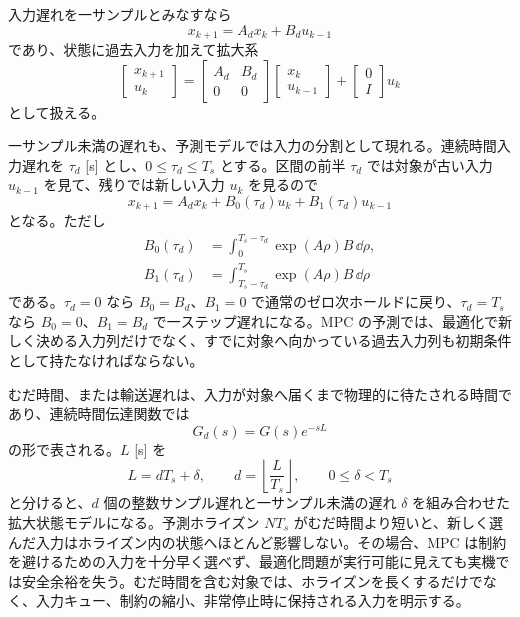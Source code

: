 入力遅れを一サンプルとみなすなら
\begin{equation}
  x_{k+1}=A_dx_k+B_du_{k-1}
\end{equation}
であり、状態に過去入力を加えて拡大系
\begin{equation}
  \begin{bmatrix}x_{k+1}\\ u_k\end{bmatrix}
  =
  \begin{bmatrix}A_d&B_d\\0&0\end{bmatrix}
  \begin{bmatrix}x_k\\ u_{k-1}\end{bmatrix}
  +
  \begin{bmatrix}0\\ I\end{bmatrix}u_k
\end{equation}
として扱える。

一サンプル未満の遅れも、予測モデルでは入力の分割として現れる。連続時間入力遅れを $\tau_d$ [s] とし、$0\le\tau_d\le T_s$ とする。区間の前半 $\tau_d$ では対象が古い入力 $u_{k-1}$ を見て、残りでは新しい入力 $u_k$ を見るので
\begin{equation}
  x_{k+1}=A_dx_k+B_0(\tau_d)u_k+B_1(\tau_d)u_{k-1}
\end{equation}
となる。ただし
\begin{align}
  B_0(\tau_d)&=\int_0^{T_s-\tau_d}\exp(A\rho)B\,\dd\rho,\\
  B_1(\tau_d)&=\int_{T_s-\tau_d}^{T_s}\exp(A\rho)B\,\dd\rho
\end{align}
である。$\tau_d=0$ なら $B_0=B_d$、$B_1=0$ で通常のゼロ次ホールドに戻り、$\tau_d=T_s$ なら $B_0=0$、$B_1=B_d$ で一ステップ遅れになる。MPC の予測では、最適化で新しく決める入力列だけでなく、すでに対象へ向かっている過去入力列も初期条件として持たなければならない。

むだ時間、または輸送遅れは、入力が対象へ届くまで物理的に待たされる時間であり、連続時間伝達関数では
\begin{equation}
  G_d(s)=G(s)e^{-sL}
\end{equation}
の形で表される。$L$ [s] を
\begin{equation}
  L=dT_s+\delta,
  \qquad
  d=\left\lfloor\frac{L}{T_s}\right\rfloor,
  \qquad
  0\le\delta<T_s
\end{equation}
と分けると、$d$ 個の整数サンプル遅れと一サンプル未満の遅れ $\delta$ を組み合わせた拡大状態モデルになる。予測ホライズン $NT_s$ がむだ時間より短いと、新しく選んだ入力はホライズン内の状態へほとんど影響しない。その場合、MPC は制約を避けるための入力を十分早く選べず、最適化問題が実行可能に見えても実機では安全余裕を失う。むだ時間を含む対象では、ホライズンを長くするだけでなく、入力キュー、制約の縮小、非常停止時に保持される入力を明示する。

